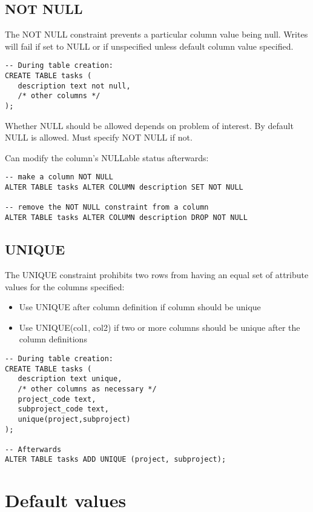 \subsection{NOT NULL}\label{not-null}

The NOT NULL constraint prevents a particular column value being null.
Writes will fail if set to NULL or if unspecified unless default column value specified.

\begin{verbatim}
-- During table creation:
CREATE TABLE tasks (
   description text not null,
   /* other columns */
);
\end{verbatim}


Whether NULL should be allowed depends on problem of interest.
By default NULL is allowed.
Must specify NOT NULL if not.

Can modify the column's NULLable status afterwards:
\begin{verbatim}
-- make a column NOT NULL
ALTER TABLE tasks ALTER COLUMN description SET NOT NULL

-- remove the NOT NULL constraint from a column
ALTER TABLE tasks ALTER COLUMN description DROP NOT NULL
\end{verbatim}


\subsection{UNIQUE}\label{unique}

The UNIQUE constraint prohibits two rows from having an equal set of
attribute values for the columns specified:

\begin{itemize}
\item Use UNIQUE after column definition if column should be unique
\item Use UNIQUE(col1, col2) if two or more columns should be unique after the column definitions
\end{itemize}


\begin{verbatim}
-- During table creation:
CREATE TABLE tasks (
   description text unique,
   /* other columns as necessary */
   project_code text,
   subproject_code text,
   unique(project,subproject)
); 

-- Afterwards
ALTER TABLE tasks ADD UNIQUE (project, subproject);
\end{verbatim}

\section{Default values}
\label{sec:default-values}

